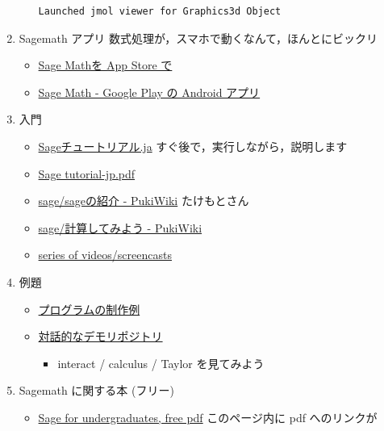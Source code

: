 \documentclass[dvipdfmx,11pat]{jarticle}
\begin{document}
\begin{enumerate}
\begin{enumerate}
\label{org8df3d32}
\begin{verbatim}
Launched jmol viewer for Graphics3d Object
\end{verbatim}
\end{enumerate}
\item Sagemath アプリ
\label{sec:orgb3343d7}
数式処理が，スマホで動くなんて，ほんとにビックリ
\begin{itemize}
\item \href{https://itunes.apple.com/jp/app/sage-math/id496492945?mt=8}{Sage Mathを App Store で}
\item \href{https://play.google.com/store/apps/details?id=org.sagemath.droid\&hl=ja}{Sage Math - Google Play の Android アプリ}
\end{itemize}
\item 入門
\label{sec:orgc7e4a24}
\begin{itemize}
\item \href{http://doc.sagemath.org/html/ja/tutorial/index.html}{Sageチュートリアル.ja} すぐ後で，実行しながら，説明します
\item \href{http://doc.sagemath.org/pdf/ja/tutorial/tutorial-jp.pdf}{Sage tutorial-jp.pdf}
\item \href{http://www.pwv.co.jp/\%7Etake/TakeWiki/index.php?sage\%2Fsage\%E3\%81\%AE\%E7\%B4\%B9\%E4\%BB\%8B}{sage/sageの紹介 - PukiWiki} たけもとさん
\item \href{http://www.pwv.co.jp/\~take/TakeWiki/index.php?sage\%2F\%E8\%A8\%88\%E7\%AE\%97\%E3\%81\%97\%E3\%81\%A6\%E3\%81\%BF\%E3\%82\%88\%E3\%81\%86}{sage/計算してみよう - PukiWiki}
\item \href{http://www.sagemath.org/help-video.html}{series of videos/screencasts}
\end{itemize}
\item 例題
\label{sec:orge71a0e7}
\begin{itemize}
\item \href{http://doc.sagemath.org/html/en/constructions/index.html}{プログラムの制作例}
\item \href{https://wiki.sagemath.org/interact}{対話的なデモリポジトリ} 
\begin{itemize}
\item interact / calculus / Taylor  を見てみよう
\end{itemize}
\end{itemize}
\item Sagemath に関する本 (フリー)
\label{sec:orgb9138a8}
\begin{itemize}
\item \href{http://www.gregorybard.com/Sage.html}{Sage for undergraduates, free pdf}   このページ内に pdf へのリンクが

\end{itemize}
\end{enumerate}
\end{document}

